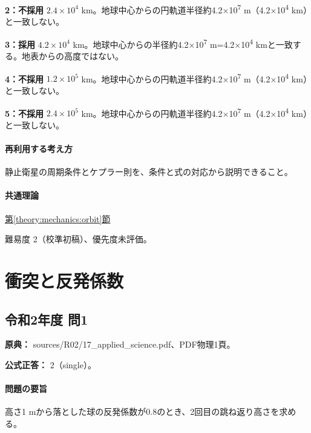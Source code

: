 \noindent\textbf{2：不採用} \(2.4\times10^4\) km。地球中心からの円軌道半径約4.2×10\textsuperscript{7} m（4.2×10\textsuperscript{4} km）と一致しない。\par

\noindent\textbf{3：採用} \(4.2\times10^4\) km。地球中心からの半径約4.2×10\textsuperscript{7} m=\allowbreak{}4.2×10\textsuperscript{4} kmと一致する。地表からの高度ではない。\par

\noindent\textbf{4：不採用} \(1.2\times10^5\) km。地球中心からの円軌道半径約4.2×10\textsuperscript{7} m（4.2×10\textsuperscript{4} km）と一致しない。\par

\noindent\textbf{5：不採用} \(2.4\times10^5\) km。地球中心からの円軌道半径約4.2×10\textsuperscript{7} m（4.2×10\textsuperscript{4} km）と一致しない。\par

\paragraph{再利用する考え方} 静止衛星の周期条件とケプラー則を、条件と式の対応から説明できること。

\paragraph{共通理論} \hyperref[theory:mechanics:orbit]{第\ref*{theory:mechanics:orbit}節}

\par 難易度 2（校準初稿）、優先度未評価。

\section{衝突と反発係数}

\subsection{令和2年度 問1}
\label{q:r02-reg-applied-01}

\noindent\textbf{原典：} sources/R02/17\_applied\_science.pdf、PDF物理1頁。

\textbf{公式正答：} 2（single）。

\paragraph{問題の要旨} 高さ1 mから落とした球の反発係数が0.8のとき、2回目の跳ね返り高さを求める。

